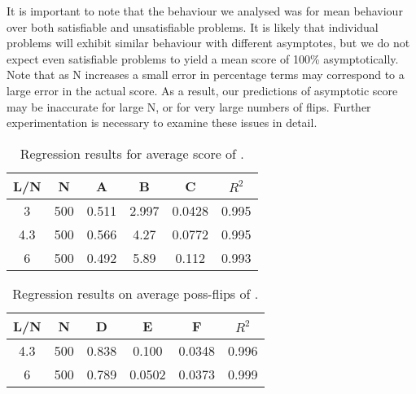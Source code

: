 It is important to note that the behaviour we analysed was for mean behaviour
over both satisfiable and unsatisfiable problems.  It is likely that
individual problems will exhibit similar behaviour with different asymptotes,
but we do not expect even satisfiable problems to yield a mean
score of 100\% asymptotically.
Note that as N increases a small error in percentage
terms may correspond to a large error in the actual score.
As a result, our predictions of asymptotic score may be
inaccurate for large N, or for very large numbers of flips.
Further experimentation is necessary to examine these issues in detail.

\begin{table}[htb]
\begin{center}
\begin{tabular}{|c|c|c|c|c|c|}
\hline
L/N&N&A&B&C&$R^2$\\\hline
3&500&0.511&2.997&0.0428&0.995\\	%
\hline
4.3&500&0.566&4.27&0.0772&0.995\\	%
\hline
6&500&0.492&5.89&0.112&0.993\\
\hline
\end{tabular}
\end{center}
\caption{Regression results for average score of \GSAT.\protect\footnotemark}
\label{tab-score}
\end{table}

\begin{table}[htb]
\begin{center}
\begin{tabular}{|c|c|c|c|c|c|}
\hline
L/N&N&D&E&F&$R^2$\\\hline
4.3&500&0.838&0.100&0.0348&0.996\\	%
\hline
6&500&0.789&0.0502&0.0373&0.999\\
\hline
\end{tabular}
\end{center}
\caption{Regression results on average poss-flips of \GSAT.}
\label{tab-possflips}
\end{table}

